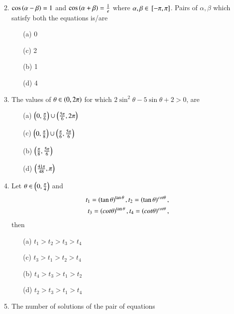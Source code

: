 \documentclass[journal,12pt,twocolumn,article]{IEEEtran}
\theoremstyle{remark}
\begin{document}
\begin{enumerate}[start = 20]
\begin{multicols}{2}
\begin{enumerate}
\end{enumerate}
\end{multicols}
\item $\cos\left(\alpha - \beta\right)=1$ and $\cos\left(\alpha + \beta\right)=\frac{1}{e}$ where $\alpha, \beta \in {}\left[-\pi,\pi\right]$. Pairs of $\alpha, \beta$ which satisfy both the equations is/are
\hfill{}
\begin{multicols}{2}
\begin{enumerate}
\item[(a)] 0
\item[(c)] 2
\columnbreak
\item[(b)] 1
\item[(d)] 4 
\end{enumerate}
\end{multicols}
\item The values of $\theta \in \left(0,2\pi\right)$ for which $2\sin^2\theta - 5\sin\theta + 2 > 0$, are
\hfill{}
\begin{multicols}{2}
\begin{enumerate}
\item[(a)] $\left(0,\frac{\pi}{6}\right)\cup\left(\frac{5\pi}{6},2\pi\right)$
\item[(c)] $\left(0,\frac{\pi}{8}\right)\cup\left(\frac{\pi}{6},\frac{5\pi}{6}\right)$
\columnbreak
\item[(b)] $\left(\frac{\pi}{8},\frac{5\pi}{6}\right)$
\item[(d)] $\left(\frac{41\pi}{48},\pi\right)$
\end{enumerate}
\end{multicols}
\item Let $\theta \in \left(0,\frac{\pi}{4}\right)$ and 
\begin{align*}
t_1 = \left(\tan\theta\right)^{\tan\theta}, t_2 = \left(\tan\theta\right)^{cot\theta},\\t_3 = \left(cot\theta\right)^{\tan\theta}, t_4 = \left(cot\theta\right)^{cot\theta},
\end{align*} then
\hfill{}
\begin{multicols}{2}
\begin{enumerate}
\item[(a)] $t_1>t_2>t_3>t_4$
\item[(c)] $t_3>t_1>t_2>t_4$
\columnbreak
\item[(b)] $t_4>t_3>t_1>t_2$
\item[(d)] $t_2>t_3>t_1>t_4$
\end{enumerate}
\end{multicols}
\item The number of solutions of the pair of equations\\

\end{enumerate}
\end{document}

